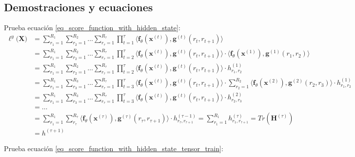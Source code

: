 \documentclass[spanish]{article}
\theoremstyle{definition}
\theoremstyle{remark}
\numberwithin{equation}{section}
\numberwithin{equation}{section} %
\begin{document}
\subsection{Demostraciones y ecuaciones}
Prueba ecuación  \eqref{eq_score_function_with_hidden_state}:
\begin{equation}
\label{eq_score_function_with_hidden_state_proof_tensor_ring}
\begin{split}
\ell^y\big(\boldsymbol{X}\big) & 
 =\sum^{R_1}_{r_1=1}\sum^{R_2}_{r_2=1}\ldots\sum^{R_\tau}_{r_\tau=1}\prod^\tau_{t=1}\langle \boldsymbol{f}_\theta(\boldsymbol{x}^{(t)}),\boldsymbol{g}^{(t)}(r_t,r_{t+1}) \rangle
 \\ &
 =\sum^{R_1}_{r_1=1}\sum^{R_2}_{r_2=1}\ldots\sum^{R_\tau}_{r_\tau=1}\prod^\tau_{t=2}\langle \boldsymbol{f}_\theta(\boldsymbol{x}^{(t)}),\boldsymbol{g}^{(t)}(r_t,r_{t+1}) \rangle \cdot
 \langle \boldsymbol{f}_\theta(\boldsymbol{x}^{(1)}),\boldsymbol{g}^{(1)}(r_1,r_2) \rangle
 \\ &
 =\sum^{R_1}_{r_1=1}\sum^{R_2}_{r_2=1}\ldots\sum^{R_\tau}_{r_\tau=1}\prod^\tau_{t=2}\langle \boldsymbol{f}_\theta(\boldsymbol{x}^{(t)}),\boldsymbol{g}^{(t)}(r_t,r_{t+1}) \rangle \cdot
h^{(1)}_{r_1,r_2} 
 \\ &
 =\sum^{R_1}_{r_1=1}\sum^{R_3}_{r_3=1}\ldots\sum^{R_\tau}_{r_\tau=1}\prod^\tau_{t=3}\langle \boldsymbol{f}_\theta(\boldsymbol{x}^{(t)}),\boldsymbol{g}^{(t)}(r_t,r_{t+1}) \rangle \cdot \sum^{R_2}_{r_2=1}  \langle \boldsymbol{f}_\theta(\boldsymbol{x}^{(2)}),\boldsymbol{g}^{(2)}(r_2,r_3) \rangle \cdot
h^{(1)}_{r_1,r_2} 
 \\ &
 =\sum^{R_1}_{r_1=1}\sum^{R_3}_{r_3=1}\ldots\sum^{R_\tau}_{r_\tau=1}\prod^\tau_{t=3}\langle \boldsymbol{f}_\theta(\boldsymbol{x}^{(t)}),\boldsymbol{g}^{(t)}(r_t,r_{t+1}) \rangle \cdot
h^{(2)}_{r_2,r_3} 
 \\ &
  =\ldots
   \\ &
 =\sum^{R_1}_{r_1=1}\sum^{R_\tau}_{r_\tau}\langle \boldsymbol{f}_\theta(\boldsymbol{x}^{(\tau)}),\boldsymbol{g}^{(\tau)}(r_\tau,r_{\tau+1}) \rangle \cdot
    h^{(\tau-1)}_{r_\tau,r_{\tau+1}}= \sum^{R_{1}}_{r_{1}=1} h^{(\tau)}_{r_1,r_{\tau+1}} = Tr(\boldsymbol{H}^{(\tau)}) \\ & 
    = h^{(\tau+1)}
\end{split}
\end{equation} \par
Prueba ecuación  \eqref{eq_score_function_with_hidden_state_tensor_train}:
\end{document}
